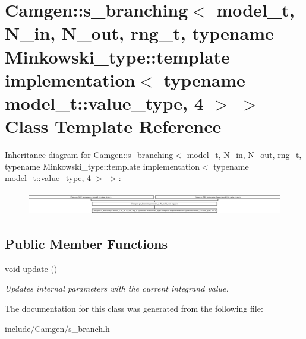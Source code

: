 \hypertarget{a00491}{}\section{Camgen\+:\+:s\+\_\+branching$<$ model\+\_\+t, N\+\_\+in, N\+\_\+out, rng\+\_\+t, typename Minkowski\+\_\+type\+:\+:template implementation$<$ typename model\+\_\+t\+:\+:value\+\_\+type, 4 $>$ $>$ Class Template Reference}
\label{a00491}
Inheritance diagram for Camgen\+:\+:s\+\_\+branching$<$ model\+\_\+t, N\+\_\+in, N\+\_\+out, rng\+\_\+t, typename Minkowski\+\_\+type\+:\+:template implementation$<$ typename model\+\_\+t\+:\+:value\+\_\+type, 4 $>$ $>$\+:\begin{figure}[H]
\begin{center}
\leavevmode
\includegraphics[height=1.012048cm]{a00491}
\end{center}
\end{figure}
\subsection*{Public Member Functions}
\begin{DoxyCompactItemize}
\item 
\hypertarget{a00491_ac6456d02ca52575ab6181a175db7655d}{}void \hyperlink{a00491_ac6456d02ca52575ab6181a175db7655d}{update} ()\label{a00491_ac6456d02ca52575ab6181a175db7655d}

\begin{DoxyCompactList}\small\item\em Updates internal parameters with the current integrand value. \end{DoxyCompactList}\end{DoxyCompactItemize}


The documentation for this class was generated from the following file\+:\begin{DoxyCompactItemize}
\item 
include/\+Camgen/s\+\_\+branch.\+h\end{DoxyCompactItemize}
